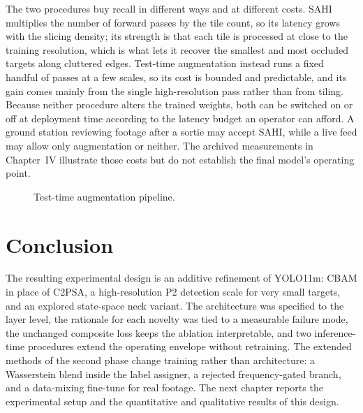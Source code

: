 The two procedures buy recall in different ways and at different costs. SAHI
multiplies the number of forward passes by the tile count, so its latency grows
with the slicing density; its strength is that each tile is processed at close
to the training resolution, which is what lets it recover the smallest and most
occluded targets along cluttered edges. Test-time augmentation instead runs a
fixed handful of passes at a few scales, so its cost is bounded and predictable,
and its gain comes mainly from the single high-resolution pass rather than from
tiling. Because neither procedure alters the trained weights, both can be
switched on or off at deployment time according to the latency budget an
operator can afford. A ground station reviewing footage after a sortie may
accept SAHI, while a live feed may allow only augmentation or neither. The
archived measurements in Chapter~IV illustrate those costs but do not establish
the final model's operating point.

\begin{figure}[tbp]
  \centering
  \caption{Test-time augmentation pipeline.}
  \label{fig:ttapipe}
\end{figure}

\section{Conclusion}
The resulting experimental design is an additive refinement of YOLO11m: CBAM
in place of C2PSA, a high-resolution P2 detection scale
for very small targets, and an explored state-space neck variant. The
architecture was specified to the layer level, the rationale for each novelty
was tied to a measurable failure mode, the unchanged composite loss keeps the
ablation interpretable, and two inference-time procedures extend the operating
envelope without retraining. The extended methods of the second phase change
training rather than architecture: a Wasserstein blend inside the label
assigner, a rejected frequency-gated branch, and a data-mixing fine-tune for
real footage. The next chapter reports the experimental setup and the
quantitative and qualitative results of this design.
